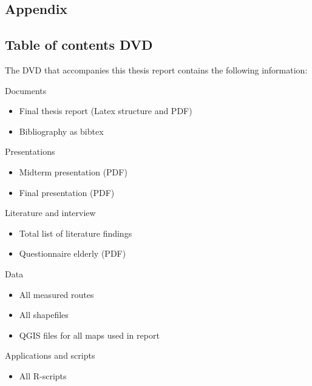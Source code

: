 \begin{appendix}
\chapter{Appendix}

\section{Table of contents DVD}
The DVD that accompanies this thesis report contains the following information:

Documents
\begin{itemize}
	\item Final thesis report (Latex structure and PDF)
	\item Bibliography as bibtex
\end{itemize}

Presentations
\begin{itemize}
	\item Midterm presentation (PDF)
	\item Final presentation (PDF)
\end{itemize}

Literature and interview
\begin{itemize}
	\item Total list of literature findings 
	\item Questionnaire elderly (PDF)
\end{itemize}

Data
\begin{itemize}
 	\item All measured routes
 	\item All shapefiles 
 	\item QGIS files for all maps used in report
\end{itemize}

Applications and scripts
\begin{itemize}
	\item All R-scripts
\end{itemize}	


\clearpage


\end{appendix}
